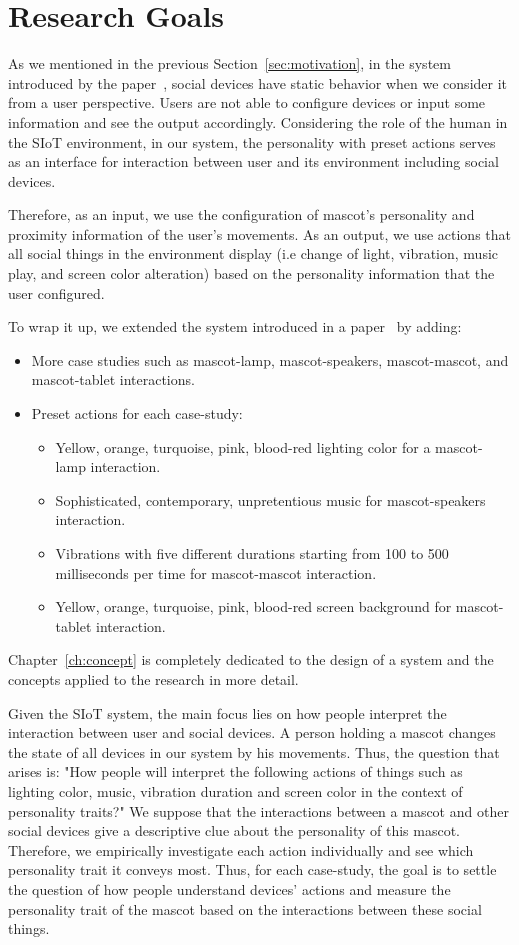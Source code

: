 \section{Research Goals}
\label{sec:research-goals}
As we mentioned in the previous Section~\ref{sec:motivation}, in the system introduced
by the paper~\cite{okada2016autonomous}, social devices have static behavior when we consider it from a user perspective.
Users are not able to configure devices or input some information and see the output accordingly.
Considering the role of the human in the SIoT environment, in our system, the personality with preset
actions serves as an interface for interaction between user and its environment including social devices.

Therefore, as an input, we use the configuration of mascot's personality and proximity
information of the user's movements.
As an output, we use actions that all social things in the environment display
(i.e change of light, vibration, music play, and screen color alteration) based
on the personality information that the user configured.

To wrap it up, we extended the system introduced in a paper~\cite{okada2016autonomous} by adding:
\begin{itemize}
    \item More case studies such as mascot-lamp, mascot-speakers, mascot-mascot, and mascot-tablet interactions.
    \item Preset actions for each case-study:
    \begin{itemize}
        \item Yellow, orange, turquoise, pink, blood-red lighting color for a mascot-lamp interaction.
        \item Sophisticated, contemporary, unpretentious music for mascot-speakers interaction.
        \item Vibrations with five different durations starting from 100 to
        500 milliseconds per time for mascot-mascot interaction.
        \item Yellow, orange, turquoise, pink, blood-red screen background for mascot-tablet interaction.
    \end{itemize}
\end{itemize}
Chapter~\ref{ch:concept} is completely dedicated to the design of a system and
the concepts applied to the research in more detail.

Given the SIoT system, the main focus lies on how people interpret the interaction between user and social devices.
A person holding a mascot changes the state of all devices in our system by his movements.
Thus, the question that arises is: "How people will interpret the following actions of things such as
lighting color, music, vibration duration and screen color in the context of personality traits?"
We suppose that the interactions between a mascot and other social
devices give a descriptive clue about the personality of this mascot.
Therefore, we empirically investigate each action individually and see which personality trait it conveys most.
Thus, for each case-study, the goal is to settle the question of how people understand devices' actions
and measure the personality trait of the mascot based on the interactions between these social things.

